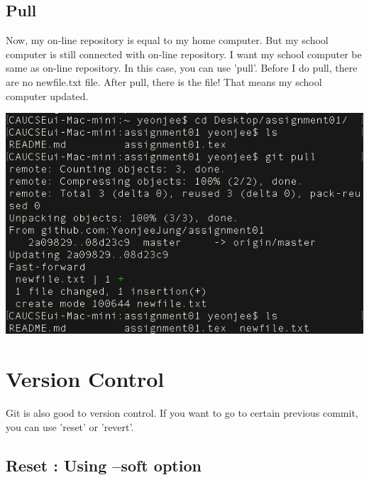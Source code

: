 \documentclass{article}
\begin{document}
\subsection{Pull}

Now, my on-line repository is equal to my home computer. But my school computer is still connected with on-line repository. I want my school computer be same as on-line repository. In this case, you can use 'pull'. Before I do pull, there are no newfile.txt file. After pull, there is the file! That means my school computer updated.
\begin{center}
    \includegraphics[scale = 0.6]{pic/pic13.png}
\end{center}

\newpage
\section{Version Control}

Git is also good to version control. If you want to go to certain previous commit, you can use 'reset' or 'revert'.

\subsection{Reset : Using --soft option}
\end{document}
